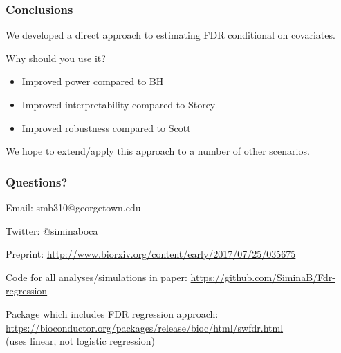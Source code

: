 \documentclass{beamer}
\begin{document}

\begin{frame}
\frametitle{Conclusions}

We developed a direct approach to estimating FDR conditional on covariates. \vspace{0.5cm}

Why should you use it?
\begin{itemize}
\item Improved power compared to BH
\item Improved interpretability compared to Storey
\item Improved robustness compared to Scott
\end{itemize} \vspace{0.5cm}

We hope to extend/apply this approach to a number of other scenarios.

\end{frame}


\begin{frame}
\frametitle{Questions?}

Email: smb310@georgetown.edu \\ \vspace{0.2cm}

Twitter: \href{https://twitter.com/siminaboca}{@siminaboca} \\ \vspace{0.2cm}

Preprint: \url{http://www.biorxiv.org/content/early/2017/07/25/035675} \\ \vspace{0.2cm}

Code for all analyses/simulations in paper: \url{https://github.com/SiminaB/Fdr-regression} \\ \vspace{0.2cm}

Package which includes FDR regression approach: \url{https://bioconductor.org/packages/release/bioc/html/swfdr.html}\\
(uses linear, not logistic regression)

\end{frame}
\end{document}
